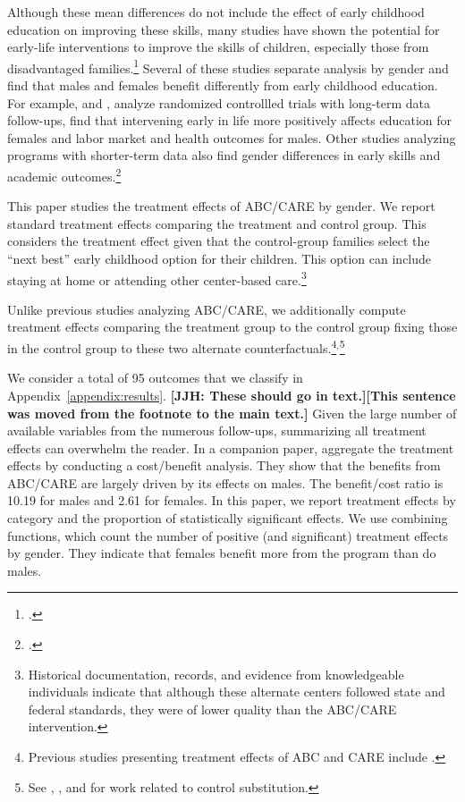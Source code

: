 Although these mean differences do not include the effect of early childhood education on improving these skills, many studies have shown the potential for early-life interventions to improve the skills of children, especially those from disadvantaged families.\footnote{\citet{Currie_2011_AER,Elango_Hojman_etal_2016_Early-Edu}.} Several of these studies separate analysis by gender and find that males and females benefit differently from early childhood education. For example, \citet{Heckman_Moon_etal_2010_QE} and \citet{Garcia_Heckman_Leaf_etal_2017_Comp_CBA_Unpublished}, analyze randomized controllled trials with long-term data follow-ups, find that intervening early in life more positively affects education for females and labor market and health outcomes for males. Other studies analyzing programs with shorter-term data also find gender differences in early skills and academic outcomes.\footnote{\citet{Deming_2009_AEJAE,Ou_Reynolds_2010_Mechanisms_CYSR,Magnuson_Kelchen_Duncan_etal_2016_ECRQ}.}

This paper studies the treatment effects of ABC/CARE by gender. We report standard treatment effects comparing the treatment and control group. This considers the treatment effect given that the control-group families select the ``next best'' early childhood option for their children. This option can include staying at home or attending other center-based care.\footnote{Historical documentation, records, and evidence from knowledgeable individuals indicate that although these alternate centers followed state and federal standards, they were of lower quality than the ABC/CARE intervention.}

Unlike previous studies analyzing ABC/CARE, we additionally compute treatment effects comparing the treatment group to the control group fixing those in the control group to these two alternate counterfactuals.\footnote{Previous studies presenting treatment effects of ABC and CARE include \citet{Ramey_etal_1985_Project-CARE_TiECSE, Clarke_Campbell_1998_ABC_Comparison_ECRQ,Campbell_Pungello_etal_2001_DP,Campbell_Ramey_etal_2002_ADS,Campbell_Wasik_etal_2008_ECRQ,Campbell_Conti_etal_2014_EarlyChildhoodInvestments}.}$^,$\footnote{See \cite{Heckman_1992_randomization}, \cite{Heckman_Hohmann_etal_2000_QJE}, and \cite{Kline_Walters_2016_QJE} for work related to control substitution.}

We consider a total of 95 outcomes that we classify in Appendix~\ref{appendix:results}. \textbf{[JJH: These should go in text.][This sentence was moved from the footnote to the main text.]} Given the large number of available variables from the numerous follow-ups, summarizing all treatment effects can overwhelm the reader. In a companion paper, \citet{Garcia_Heckman_Leaf_etal_2017_Comp_CBA_Unpublished} aggregate the treatment effects by conducting a cost/benefit analysis. They show that the benefits from ABC/CARE are largely driven by its effects on males. The benefit/cost ratio is 10.19 for males and 2.61 for females. In this paper, we report treatment effects by category and the proportion of statistically significant effects. We use combining functions, which count the number of positive (and significant) treatment effects by gender. They indicate that females benefit more from the program than do males.

